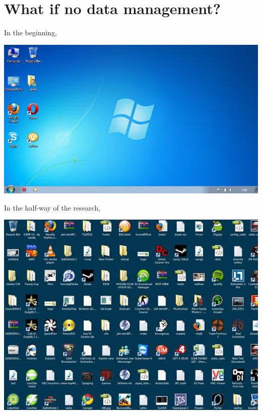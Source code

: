\section{What if no data management?}

\begin{frame}{\secname}
In the beginning, 
\begin{center}
		\includegraphics[scale=0.4]{image/desktop}
\end{center}
\end{frame}

\begin{frame}{\secname}
In the half-way of the research, \\
\begin{center}
		\includegraphics[scale=0.5]{image/messy-desktop}
\end{center}
\end{frame}

